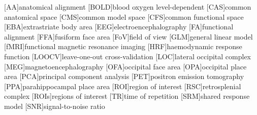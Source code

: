 \documentclass[english,12pt]{report}
\begin{document}
\begin{spacing}{1.5}
\renewcommand{\baselinestretch}{0.75}\normalsize

\begin{acronym}[longest]
    [AA]{anatomical alignment}
    [BOLD]{blood oxygen level-dependent}
    [CAS]{common anatomical space}
    [CMS]{common model space}
    [CFS]{common functional space}
    [EBA]{extrastriate body area}
    [EEG]{electroencephalography}
    [FA]{functional alignment}
    [FFA]{fusiform face area}
    [FoV]{field of view}
    [GLM]{general linear model}
    [fMRI]{functional magnetic resonance imaging}
    [HRF]{haemodynamic response function}
    [LOOCV]{leave-one-out cross-validation}
    [LOC]{lateral occipital complex}
    [MEG]{magneto\-encephalo\-graphy}
    [OFA]{occipital face area}
    [OPA]{occipital place area}
    [PCA]{principal component analysis}
    [PET]{positron emission tomography}
    [PPA]{parahippocampal place area}
    [ROI]{region of interest}
    [RSC]{retrosplenial complex}
    [ROIs]{regions of interest}
    [TR]{time of repetition}
    [SRM]{shared response model}
    [SNR]{signal-to-noise ratio}
\end{acronym}



\renewcommand{\baselinestretch}{1}\normalsize




\tableofcontents













\end{spacing}
\end{document}
